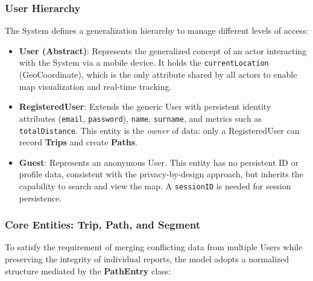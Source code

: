 \subsubsection*{User Hierarchy}
The System defines a generalization hierarchy to manage different levels of access:
\begin{itemize}
    \item \textbf{User (Abstract)}: Represents the generalized concept of an actor interacting with the System via a mobile device. It holds the \texttt{currentLocation} (GeoCoordinate), which is the only attribute shared by all actors to enable map visualization and real-time tracking.
    \item \textbf{RegisteredUser}: Extends the generic User with persistent identity attributes (\texttt{email}, \texttt{password}), \texttt{name}, \texttt{surname}, and metrics such as \texttt{totalDistance}. This entity is the \emph{owner} of data: only a RegisteredUser can record \textbf{Trips} and create \textbf{Paths}.
    \item \textbf{Guest}: Represents an anonymous User. This entity has no persistent ID or profile data, consistent with the privacy-by-design approach, but inherits the capability to search and view the map. A \texttt{sessionID} is needed for session persistence.
\end{itemize}

\subsubsection*{Core Entities: Trip, Path, and Segment}
To satisfy the requirement of merging conflicting data from multiple Users while preserving the integrity of individual reports, the model adopts a normalized structure mediated by the \textbf{PathEntry} class:

